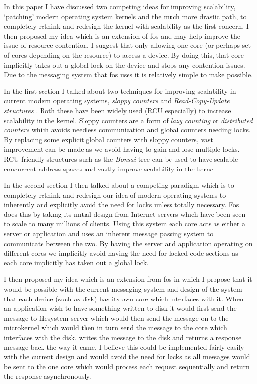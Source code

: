 \documentclass[journal]{IEEEtran}
\begin{document}
In this paper I have discussed two competing ideas for improving scalability, `patching' modern operating system kernels and the much more drastic path, to completely rethink and redesign the kernel with scalability as the first concern. I then proposed my idea which is an extension of fos \cite{fos} and may help improve the issue of resource contention. I suggest that only allowing one core (or perhaps set of cores depending on the resource) to access a device. By doing this, that core implicitly takes out a global lock on the device and stops any contention issues. Due to the messaging system that fos uses it is relatively simple to make possible.

In the first section I talked about two techniques for improving scalability in current modern operating systems, \emph{sloppy counters} \cite{sloppy-counters} and \emph{Read-Copy-Update structures} \cite{RCU}. Both these have been widely used (RCU especially) to increase scalability in the kernel. Sloppy counters are a form of \emph{lazy counting} or \emph{distributed counters} which avoids needless communication and global counters needing locks. By replacing some explicit global counters with sloppy counters, vast improvement can be made as we avoid having to gain and lose multiple locks. RCU-friendly structures such as the \emph{Bonsai} tree can be used to have scalable concurrent address spaces and vastly improve scalability in the kernel \cite{Bonsai}.

In the second section I then talked about a competing paradigm which is to completely rethink and redesign our idea of modern operating systems to inherently and explicitly avoid the need for locks unless totally necessary. Fos \cite{fos} does this by taking its initial design from Internet servers which have been seen to scale to many millions of clients. Using this system each core acts as either a server or application and uses an inherent message passing system to communicate between the two. By having the server and application operating on different cores we implicitly avoid having the need for locked code sections as each core implicitly has taken out a global lock. 

I then proposed my idea which is an extension from fos in which I propose that it would be possible with the current messaging system and design of the system that each device (such as disk) has its own core which interfaces with it. When an application wish to have something written to disk it would first send the message to filesystem server which would then send the message on to the microkernel which would then in turn send the message to the core which interfaces with the disk, writes the message to the disk and returns a response message back the way it came. I believe this could be implemented fairly easily with the current design and would avoid the need for locks as all messages would be sent to the one core which would process each request sequentially and return the response asynchronously. 




\end{document}
